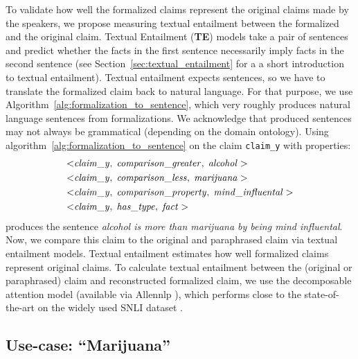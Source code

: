 To validate how well the formalized claims represent the original claims
made by the speakers, we propose measuring textual entailment between the formalized 
and the original claim. Textual Entailment (\textbf{TE}) models take a pair 
of sentences and predict whether the facts in the first sentence necessarily imply
facts in the second sentence (see Section~\ref{sec:textual_entailment} for a
a short introduction to textual entailment). Textual entailment expects 
sentences, so we have to translate the formalized claim back to natural language. 
For that purpose, we use Algorithm~\ref{alg:formalization_to_sentence}, which 
very roughly produces natural language sentences from formalizations. 
We acknowledge that produced sentences may not always be grammatical (depending on the
domain ontology). Using algorithm~\ref{alg:formalization_to_sentence} on the claim 
\texttt{claim\_y} with properties:
\begin{align*}
	< & \mathit{claim\_y}, \hspace{0.1cm} \mathit{comparison\_greater}, \hspace{0.1cm}
	\mathit{alcohol} > \\
	< & \mathit{claim\_y}, \hspace{0.1cm} \mathit{comparison\_less}, \hspace{0.1cm}
	\mathit{marijuana} >  \\
	< & \mathit{claim\_y}, \hspace{0.1cm} \mathit{comparison\_property}, \hspace{0.1cm}
	\mathit{mind\_influental} >  \\
	< & \mathit{claim\_y}, \hspace{0.1cm} \mathit{has\_type}, \hspace{0.1cm}
	\mathit{fact} > 
\end{align*}
produces the sentence \emph{alcohol is more than marijuana by being mind influental}.
Now, we compare this claim to the original and paraphrased claim via 
textual entailment models. Textual entailment estimates how well 
formalized claims represent original claims. To calculate
textual entailment between the (original or paraphrased) claim and reconstructed
formalized claim, we use the decomposable attention model \citep{parikh2016decomposable}
(available via Allennlp \citep{gardner2018allennlp}), which performs
close to the state-of-the-art on the widely used SNLI dataset \citep{bowman2015large}.

\subsection{Use-case: ``Marijuana'' }
\label{sec:usecase_ontology}

